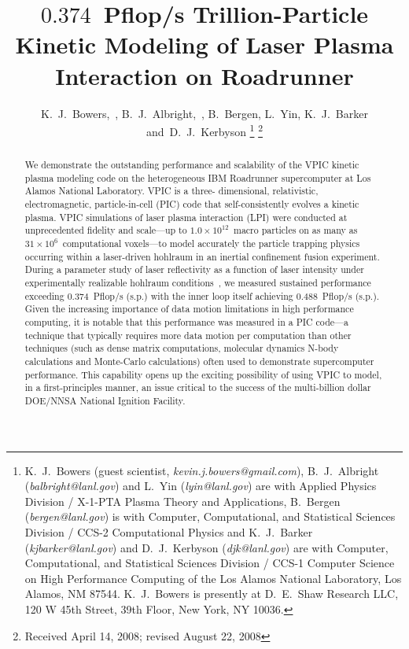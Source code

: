 \documentclass[journal,twoside]{IEEEtran}
\begin{document}
\title{$0.374$~Pflop/s Trillion-Particle Kinetic Modeling of Laser Plasma
Interaction on Roadrunner}

\author{K.~J.~Bowers,~,
        B.~J.~Albright,~,
        B.~Bergen,
        L.~Yin,
        K.~J.~Barker
        and~D.~J.~Kerbyson%
\thanks{
K.~J.~Bowers (guest scientist, \emph{kevin.j.bowers@gmail.com}),
B.~J.~Albright (\emph{balbright@lanl.gov}) and L.~Yin
(\emph{lyin@lanl.gov}) are with Applied Physics Division / X-1-PTA
Plasma Theory and Applications, B.~Bergen (\emph{bergen@lanl.gov}) is
with Computer, Computational, and Statistical Sciences Division /
CCS-2 Computational Physics and K.~J.~Barker
(\emph{kjbarker@lanl.gov}) and D.~J.~Kerbyson (\emph{djk@lanl.gov})
are with Computer, Computational, and Statistical Sciences Division /
CCS-1 Computer Science on High Performance Computing of the Los Alamos
National Laboratory, Los Alamos, NM 87544.  K.~J.~Bowers is presently
at D.~E.~Shaw Research LLC, 120 W 45th Street, 39th Floor, New York,
NY 10036.}%
\thanks{Received April 14, 2008; revised August 22, 2008}
}


\maketitle

\begin{abstract}
We demonstrate the outstanding performance and scalability of the VPIC
kinetic plasma modeling code on the heterogeneous IBM Roadrunner
supercomputer at Los Alamos National Laboratory.  VPIC is a three-
dimensional, relativistic, electromagnetic, particle-in-cell (PIC)
code that self-consistently evolves a kinetic plasma.  VPIC
simulations of laser plasma interaction (LPI) were conducted at
unprecedented fidelity and scale---up to $1.0 \times 10^{12}$~macro
particles on as many as $31 \times 10^6$~computational voxels---to
model accurately the particle trapping physics occurring within a
laser-driven hohlraum in an inertial confinement fusion experiment.
During a parameter study of laser reflectivity as a function of laser
intensity under experimentally realizable hohlraum
conditions~\cite{AAC_Conference_Paper}, we measured sustained
performance exceeding $0.374$~Pflop/s (s.p.) with the inner loop
itself achieving $0.488$~Pflop/s (s.p.).  Given the increasing
importance of data motion limitations in high performance computing,
it is notable that this performance was measured in a PIC code---a
technique that typically requires more data motion per computation
than other techniques (such as dense matrix computations, molecular
dynamics N-body calculations and Monte-Carlo calculations) often used
to demonstrate supercomputer performance.  This capability opens up
the exciting possibility of using VPIC to model, in a first-principles
manner, an issue critical to the success of the multi-billion dollar
DOE/NNSA National Ignition Facility.
\end{abstract}
\end{document}

